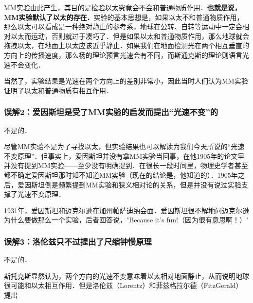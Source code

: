 MM实验由此产生，其目的是检验以太究竟会不会和普通物质作用．\textbf{也就是说，MM实验默认了以太的存在．}实验的基本思想是，如果以太不和普通物质作用，那么以太可以看成是一种绝对静止的参考系，地球在公转、自转等运动中一定会相对以太而运动，否则就过于凑巧了．但是如果以太和普通物质作用，那么地球就会拖拽以太，在地面上以太应该近乎静止．如果我们在地面检测光在两个相互垂直的方向上的传播速度，那么杨的理论预言光速会有不同，而斯通克斯的理论则语言光速不会变化．

当然了，实验结果是光速在两个方向上的差别非常小，因此当时人们认为MM实验证明了以太和普通物质有相互作用．

\subsubsection{误解2：爱因斯坦是受了MM实验的启发而提出“光速不变”的}

不是的．

尽管MM实验不是为了寻找以太，但实验结果也可以解读为我们今天所说的“光速不变原理”．但事实上，爱因斯坦并没有拿MM实验当回事，在他1905年的论文里并没有提到MM实验——至少没有明确提到．在很长一段时间里，物理史学者甚至都不确定爱因斯坦那时知不知道MM实验（现在的结论是，他知道的）．1905年之后，爱因斯坦倒是频繁提到MM实验和狭义相对论的关系，但是并没有说过实验支撑了光速不变原理．

1931年，爱因斯坦和迈克尔逊在加州帕萨迪纳会面．爱因斯坦很不解地问迈克尔逊为什么要做那么一个实验，后者回答说，"Because it's fun!（因为很有意思啊！）" 

\subsubsection{误解3：洛伦兹只不过提出了尺缩钟慢原理}

不是的．

斯托克斯显然认为，两个方向的光速不变意味着以太相对地面静止，从而说明地球很可能和以太相互作用．但是洛伦兹（Lorentz）和菲兹格拉尔德（FitzGerald）提出



